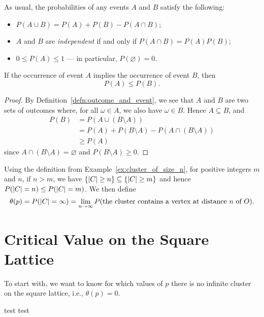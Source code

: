 \documentclass[a4paper, 12pt]{article}
\begin{document}
As usual, the probabilities of any events $A$ and $B$ satisfy the following:
\begin{itemize}
    \item $P(A \cup B) = P(A) + P(B) - P(A \cap B)$;
    \item $A$ and $B$ are \textit{independent} if and only if $P(A \cap B) = P(A) P(B)$;
    \item $0 \leq P(A) \leq 1$ --- in particular, $P(\varnothing) = 0$.
\end{itemize}

\begin{lem}\label{lem:event_subseteq}
If the occurrence of event $A$ implies the occurrence of event $B$, then $$P(A) \leq P(B).$$
\end{lem}
\begin{proof}
By Definition~\ref{defn:outcome_and_event}, we see that $A$ and $B$ are two sets of outcomes where, for all $\omega \in A$, we also have $\omega \in B$. Hence $A \subseteq B$, and 
\begin{align*}
    P(B) 
    &= P(A \cup (B \setminus A))\\
    &= P(A) + P(B \setminus A) - P(A \cap (B \setminus A))\\
    &\geq P(A)
\end{align*}
since $A \cap (B \setminus A) = \varnothing$ and $P(B \setminus A) \geq 0$.
\end{proof}

\begin{cor}\label{cor:inf_cluster}
Using the definition from Example~\ref{ex:cluster_of_size_n}, for positive integers $m$ and $n$, if $n > m$, we have $\{\lvert C \rvert \geq n\} \subseteq \{\lvert C \rvert \geq m\}$ and hence $P(\lvert C \rvert = n) \leq P(\lvert C \rvert = m)$. We then define
\[
\theta(p) 
= P(\lvert C \rvert = \infty)
= \lim_{n \to \infty} P(\text{the cluster contains a vertex at distance } n \text{ of } O).
\]
\end{cor}

\section{Critical Value on the Square Lattice}
To start with, we want to know for which values of $p$ there is no infinite cluster on the square lattice, i.e., $\theta(p) = 0$.

\begin{prop}
test test
\end{prop}
\end{document}
